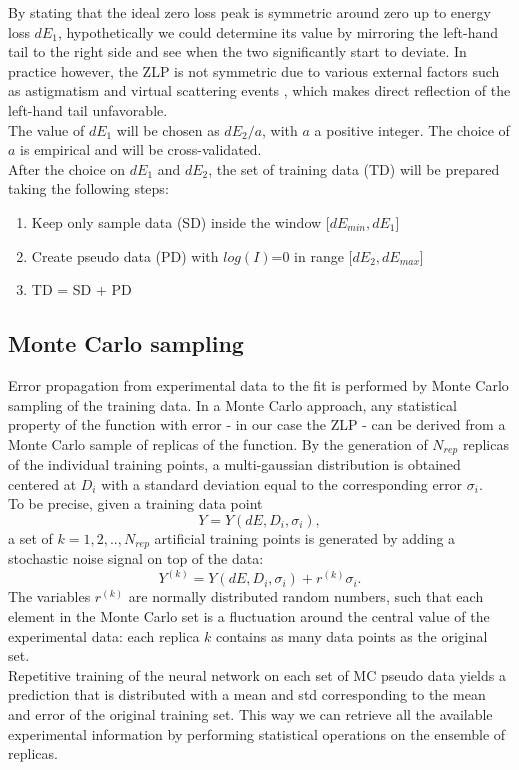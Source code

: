 \documentclass[11pt,a4paper]{article}
\numberwithin{equation}{section}
\numberwithin{figure}{section}
\numberwithin{table}{section}
\begin{document}
By stating that the ideal zero loss peak is symmetric around zero up to energy loss $dE_1$, hypothetically we could determine its value by mirroring the left-hand tail to the right side and see when the two significantly start to deviate. In practice however, the ZLP is not symmetric due to various external factors such as astigmatism \cite{astigma} and virtual scattering events \cite{rafferty}, which makes direct reflection of the left-hand tail unfavorable. \\
The value of $dE_1$ will be chosen as $dE_2 / a$, with $a$ a positive integer. The choice of $a$ is empirical and will be cross-validated. \\ 
After the choice on $dE_1$ and $dE_2$, the set of training data (TD) will be prepared taking the following steps:
\begin{enumerate}
    \item Keep only sample data (SD) inside the window [$dE_{min}, dE_1$]
    \item Create pseudo data (PD) with $log(I)$=0 in range [$dE_2, dE_{max}$]
    \item TD = SD + PD
\end{enumerate}

\subsection{Monte Carlo sampling}
Error propagation from experimental data to the fit is performed by Monte Carlo sampling of the training data. In a Monte Carlo approach, any statistical property of the function with error - in our case the ZLP - can be derived from a Monte Carlo sample of replicas of the function. By the generation of $N_{rep}$ replicas of the individual training points, a multi-gaussian distribution is obtained centered at $D_i$ with a standard deviation equal to the corresponding error $\sigma_i$. \\
To be precise, given a training data point
\begin{equation}
    Y = Y(dE, D_i,\sigma_i), 
\end{equation} a set of $k= 1,2,..,N_{rep}$ artificial training points is generated by adding a stochastic noise signal on top of the data: 
\begin{equation}
    Y^{(k)} = Y(dE, D_i,\sigma_i) + r^{(k)}\sigma_i.
\end{equation}
The variables $r^{(k)}$ are normally distributed random numbers, such that each element in the Monte Carlo set is a fluctuation around the central value of the experimental data: each replica $k$ contains as many data points as the original set. \\
Repetitive training of the neural network on each set of MC pseudo data yields a prediction that is distributed with a mean and std corresponding to the mean and error of the original training set. This way we can retrieve all the available experimental information by performing statistical operations on the ensemble of replicas.\\
\end{document}
